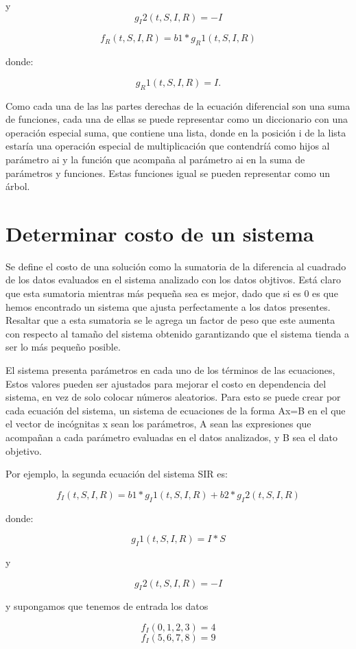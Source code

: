 y
$$g_I2(t,S,I,R) = -I$$

$$f_R (t,S,I,R) = b1 * g_R1 (t,S,I,R)$$

donde:

$$g_R1(t,S,I,R) = I.$$

Como cada una de las las partes derechas de la ecuación diferencial son una suma de funciones, cada una de ellas se puede representar como un diccionario con una operación especial suma, que contiene una lista, donde en la posición i de la lista estaría una operación especial de multiplicación que contendríá como hijos al parámetro ai y la función que acompaña al parámetro ai en la suma de parámetros y funciones. Estas funciones igual se pueden representar como un árbol.

\section{Determinar costo de un sistema}

Se define el costo de una solución como la sumatoria de la diferencia al cuadrado de los datos evaluados en el sistema analizado con los datos objtivos. Está claro que esta sumatoria mientras más pequeña sea es mejor, dado que si es 0 es que hemos encontrado un sistema que ajusta perfectamente a los datos presentes. Resaltar que a esta sumatoria se le agrega un factor de peso que este aumenta con respecto al tamaño del sistema obtenido garantizando que el sistema tienda a ser lo más pequeño posible.

El sistema presenta parámetros en cada uno de los términos de las ecuaciones, Estos valores pueden ser ajustados para mejorar el costo en dependencia del sistema, en vez de solo colocar números aleatorios. Para esto se puede crear por cada ecuación del sistema, un sistema de ecuaciones de la forma Ax=B en el que el vector de incógnitas x sean los parámetros, A sean las expresiones que acompañan a cada parámetro evaluadas en el datos analizados, y B sea el dato objetivo.

Por ejemplo, la segunda ecuación del sistema SIR es:

$$f_I (t,S,I,R) = b1 * g_I1 (t,S,I,R) + b2 * g_I2 (t,S,I,R)$$

donde:

$$g_I1(t,S,I,R) = I*S$$

y

$$g_I2(t,S,I,R) = -I$$

y supongamos que tenemos de entrada los datos

$$f_I(0, 1, 2, 3) = 4$$
$$f_I(5, 6, 7, 8) = 9$$

